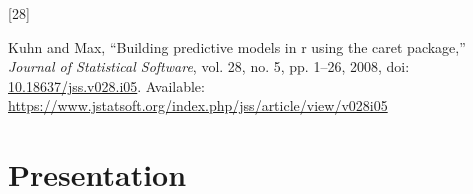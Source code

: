 \documentclass[
  letterpaper,
  DIV=11,
  numbers=noendperiod]{scrreprt}
\newlength{\cslhangindent}
\newlength{\csllabelwidth}
\newlength{\cslentryspacingunit} %
\newenvironment{CSLReferences}[2] %
 {%
  \setlength{\parindent}{0pt}
  \ifodd #1
  \let\oldpar\par
  \def\par{\hangindent=\cslhangindent\oldpar}
  \fi
  \setlength{\parskip}{#2\cslentryspacingunit}
 }%
 {}
\newcommand{\CSLLeftMargin}[1]{\parbox[t]{\csllabelwidth}{#1}}
\newcommand{\CSLRightInline}[1]{\parbox[t]{\linewidth - \csllabelwidth}{#1}\break}
\begin{document}
\begin{CSLReferences}{0}{0}
\leavevmode{}%
\CSLLeftMargin{{[}28{]} }%
\CSLRightInline{Kuhn and Max, {``Building predictive models in r using
the caret package,''} \emph{Journal of Statistical Software}, vol. 28,
no. 5, pp. 1--26, 2008, doi:
\href{https://doi.org/10.18637/jss.v028.i05}{10.18637/jss.v028.i05}.
Available:
\url{https://www.jstatsoft.org/index.php/jss/article/view/v028i05}}

\end{CSLReferences}


\hypertarget{presentation}{%
\chapter*{Presentation}\label{presentation}}

\end{document}

